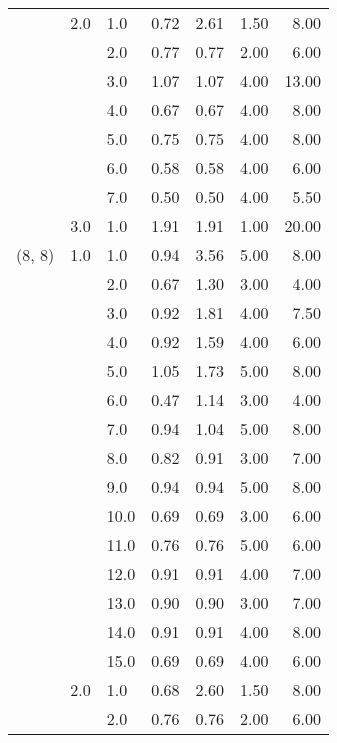 \begin{tabular}{lllrrrr}
       & 2.0 & 1.0  &       0.72 &      2.61 & 1.50 &   8.00 \\
       &     & 2.0  &       0.77 &      0.77 & 2.00 &   6.00 \\
       &     & 3.0  &       1.07 &      1.07 & 4.00 &  13.00 \\
       &     & 4.0  &       0.67 &      0.67 & 4.00 &   8.00 \\
       &     & 5.0  &       0.75 &      0.75 & 4.00 &   8.00 \\
       &     & 6.0  &       0.58 &      0.58 & 4.00 &   6.00 \\
       &     & 7.0  &       0.50 &      0.50 & 4.00 &   5.50 \\
       & 3.0 & 1.0  &       1.91 &      1.91 & 1.00 &  20.00 \\
(8, 8) & 1.0 & 1.0  &       0.94 &      3.56 & 5.00 &   8.00 \\
       &     & 2.0  &       0.67 &      1.30 & 3.00 &   4.00 \\
       &     & 3.0  &       0.92 &      1.81 & 4.00 &   7.50 \\
       &     & 4.0  &       0.92 &      1.59 & 4.00 &   6.00 \\
       &     & 5.0  &       1.05 &      1.73 & 5.00 &   8.00 \\
       &     & 6.0  &       0.47 &      1.14 & 3.00 &   4.00 \\
       &     & 7.0  &       0.94 &      1.04 & 5.00 &   8.00 \\
       &     & 8.0  &       0.82 &      0.91 & 3.00 &   7.00 \\
       &     & 9.0  &       0.94 &      0.94 & 5.00 &   8.00 \\
       &     & 10.0 &       0.69 &      0.69 & 3.00 &   6.00 \\
       &     & 11.0 &       0.76 &      0.76 & 5.00 &   6.00 \\
       &     & 12.0 &       0.91 &      0.91 & 4.00 &   7.00 \\
       &     & 13.0 &       0.90 &      0.90 & 3.00 &   7.00 \\
       &     & 14.0 &       0.91 &      0.91 & 4.00 &   8.00 \\
       &     & 15.0 &       0.69 &      0.69 & 4.00 &   6.00 \\
       & 2.0 & 1.0  &       0.68 &      2.60 & 1.50 &   8.00 \\
       &     & 2.0  &       0.76 &      0.76 & 2.00 &   6.00 \\

\end{tabular}
